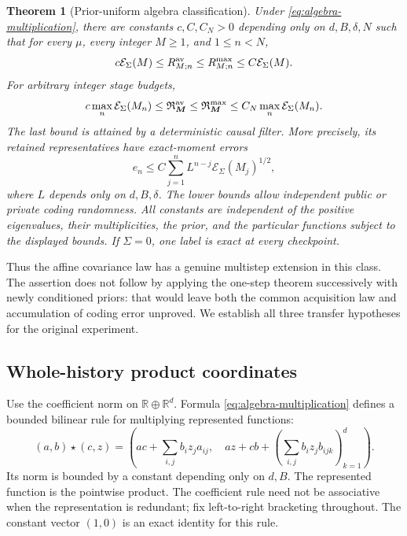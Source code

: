 \documentclass[11pt]{amsart}
\newtheorem{theorem}{Theorem}[section]
\theoremstyle{definition}\newtheorem{definition}[theorem]{Definition}
\theoremstyle{remark}\newtheorem{remark}[theorem]{Remark}
\newcommand{\R}{\mathbb R}\newcommand{\N}{\mathbb N}\newcommand{\C}{\mathbb C}
\begin{document}
\begin{theorem}[Prior-uniform algebra classification]
\label{thm:algebra-multistep}
Under \eqref{eq:algebra-multiplication}, there are constants $c,C,C_N>0$
depending only on $d,B,\delta,N$ such that for every $\mu$, every
integer $M\ge1$, and $1\le n<N$,
\begin{equation}\label{eq:algebra-checkpoint-law}
 c\mathcal E_\Sigma(M)\le R^{\rm av}_{M;n}
 \le R^{\rm max}_{M;n}\le C\mathcal E_\Sigma(M).
\end{equation}
For arbitrary integer stage budgets,
\begin{equation}\label{eq:algebra-causal-law}
 c\max_n\mathcal E_\Sigma(M_n)
 \le\mathfrak R^{\rm av}_{\boldsymbol M}
 \le\mathfrak R^{\rm max}_{\boldsymbol M}
 \le C_N\max_n\mathcal E_\Sigma(M_n).
\end{equation}
The last bound is attained by a deterministic causal filter. More
precisely, its retained representatives have exact-moment errors
\begin{equation}\label{eq:algebra-accumulation}
 e_n\le C\sum_{j=1}^n L^{n-j}\mathcal E_\Sigma(M_j)^{1/2},
\end{equation}
where $L$ depends only on $d,B,\delta$. The lower bounds allow independent
public or private coding randomness. All constants are independent of
the positive eigenvalues, their multiplicities, the prior, and the
particular functions subject to the displayed bounds. If $\Sigma=0$,
one label is exact at every checkpoint.
\end{theorem}

Thus the affine covariance law has a genuine multistep extension in this
class. The assertion does not follow by applying the one-step theorem
successively with newly conditioned priors: that would leave both the
common acquisition law and accumulation of coding error unproved.
We establish all three transfer hypotheses for the original experiment.

\subsection{Whole-history product coordinates}
Use the coefficient norm on $\R\oplus\R^d$. Formula
\eqref{eq:algebra-multiplication} defines a bounded bilinear rule for
multiplying represented functions:
\[
 (a,b)\star(c,z)=\left(ac+\sum_{i,j}b_i z_j a_{ij},\quad
             az+cb+\left(\sum_{i,j}b_i z_j b_{ijk}\right)_{k=1}^d\right).
\]
Its norm is bounded by a constant depending only on $d,B$.
The represented function is the pointwise product. The coefficient rule
need not be associative when the representation is redundant; fix
left-to-right bracketing throughout. The constant vector $(1,0)$ is
an exact identity for this rule.
\end{document}
